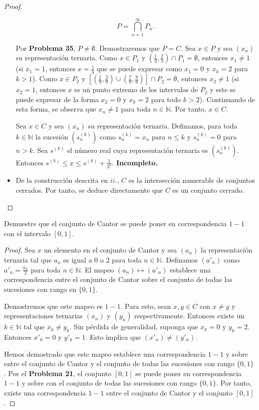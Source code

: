 \documentclass[12pt]{article}
\newcommand{\N}{\mathbb{N}}
\newenvironment{problem}[2][Problema]{\begin{trivlist}
\item[\hskip \labelsep {\bfseries #1}\hskip \labelsep {\bfseries #2.}]}{\end{trivlist}}
\begin{document}
\begin{proof}
\begin{itemize}
    $$P = \bigcap_{n=1}^{\infty}P_n.$$
    
    Por \textbf{Problema 35}, $P \neq \emptyset.$ Demostraremos que $P = C.$ Sea $x \in P$ y sea $(x_n)$ su representación ternaria. Como $x \in P_1$ y $(\frac{1}{3}, \frac{2}{3}) \cap P_1 = \emptyset$, entonces $x_1 \neq 1$ (si $x_1 = 1$, entonces $ x = \frac{1}{3}$ que se puede expresar como $x_1 = 0$ y $x_k = 2$ para $k > 1$). Como $x \in P_2$ y $[(\frac{1}{9}, \frac{2}{9}) \cup (\frac{7}{9}, \frac{8}{9})] \cap P_2 = \emptyset $, entonces $x_2 \neq 1$ (si $x_2 = 1$, entonces $x$ es un punto extremo de los intervalos de $P_2$ y este se puede expresar de la forma $x_2 = 0$ y $x_k = 2$ para todo $k > 2$). Continuando de esta forma, se observa que $x_n \neq 1$ para toda $n \in \N$. Por tanto, $x \in C$. 
    
    Sea $x \in C$ y sea $(x_n)$ su representación ternaria. Definamos, para toda $k \in \N$ la sucesión $(s^{(k)}_n)$ como $s^{(k)}_n = x_n$ para $n \leq k$ y $s^{(k)}_n = 0$ para $n > k.$ Sea $s^{(k)}$ el número real cuya representación ternaria es $(s^{(k)}_n)$. Entonces  $ s^{(k)} \leq x \leq s^{(k)} + \frac{1}{3^k} $. \textbf{Incompleto.}
    
    \item[iii.] De la construcción descrita en $ii.$, $C$ es la intersección numerable de conjuntos cerrados. Por tanto, se deduce directamente que $C$ es un conjunto cerrado.
\end{itemize}

\end{proof}


\begin{problem}{37}
Demuestre que el conjunto de Cantor se puede poner en correspondencia $1-1$ con el intervalo $[0, 1]$.

\end{problem}

\begin{proof}
Sea $x$ un elemento en el conjunto de Cantor y sea $(a_n)$ la representación ternaria tal que $a_n$ es igual a $0$ o $2$ para toda $n \in \N$. Definamos $(a'_n)$ como $a'_n = \frac{a_n}{2}$ para toda $n \in \N$. El mapeo $(a_n) \mapsto (a'_n)$ establece una correspondencia entre el conjunto de Cantor sobre el conjunto de todas las sucesiones con rango en $\{0, 1\}$.

Demostremos que este mapeo es $1-1$. Para esto, sean $x, y \in C$ con $x \neq y$ y representaciones ternarias $(x_n)$ y $(y_n)$ respectivamente. Entonces existe un $k\in \N$ tal que $x_k \neq y_k$. Sin pérdida de generalidad, suponga que $x_k = 0$ y $y_k = 2$. Entonces $x'_k = 0$ y $y'_k=1$. Esto implica que $(x'_n) \neq (y'_n)$.

Hemos demostrado que este mapeo establece una correspondencia $1-1$ y sobre entre el conjunto de Cantor y el conjunto de todas las sucesiones con rango $\{0, 1\}$. Por el \textbf{Problema 21}, el conjunto $[0, 1]$ se puede poner en correspondencia $1-1$ y sobre con el conjunto de todas las sucesiones con rango $\{0, 1\}$. Por tanto, existe una correspondencia $1-1$ entre el conjunto de Cantor y el conjunto $[0, 1]$.

\end{proof}
\end{document}
